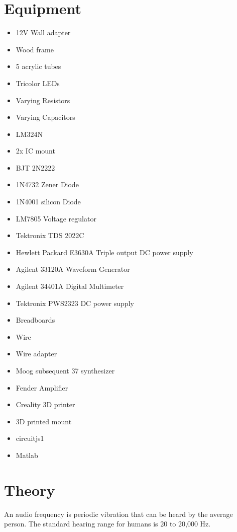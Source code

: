 \documentclass[12pt,a4paper]{article}
\begin{document}
{    \section*{Equipment}
        \begin{itemize}
            \item 12V Wall adapter
            \item Wood frame
            \item 5 acrylic tubes
            \item Tricolor LEDs
            \item Varying Resistors
            \item Varying Capacitors
            \item LM324N
            \item 2x IC mount
            \item BJT 2N2222
            \item 1N4732 Zener Diode
            \item 1N4001 silicon Diode
            \item LM7805 Voltage regulator
            \item Tektronix TDS 2022C
            \item Hewlett Packard E3630A Triple output DC power supply
            \item Agilent 33120A Waveform Generator
            \item Agilent 34401A Digital Multimeter
            \item Tektronix PWS2323 DC power supply
            \item Breadboards
            \item Wire
            \item Wire adapter
            \item Moog subsequent 37 synthesizer
            \item Fender Amplifier
            \item Creality 3D printer
            \item 3D printed mount
            \item circuitjs1
            \item Matlab
        \end{itemize}
    \section*{Theory}
    An audio frequency is periodic vibration that can be heard by the average person. The standard hearing range for humans is 20 to 20,000 Hz.

}
\end{document}
